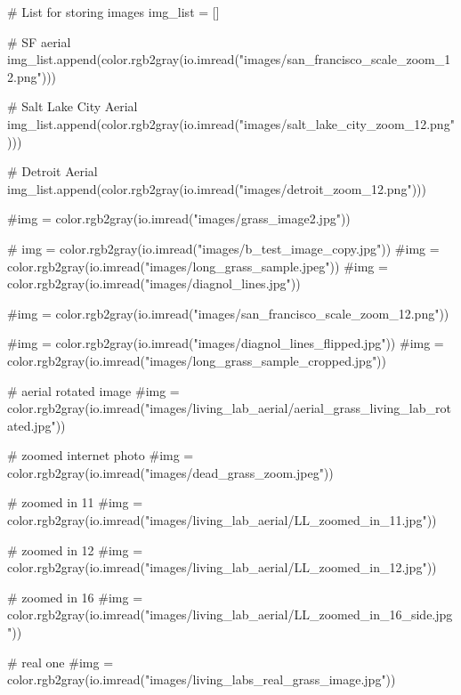 \documentclass[
  letterpaper,
  DIV=11,
  numbers=noendperiod]{scrreprt}
\newenvironment{Shaded}{\begin{snugshade}}{\end{snugshade}}
\newcommand{\CommentTok}[1]{\textcolor[rgb]{0.37,0.37,0.37}{#1}}
\newcommand{\NormalTok}[1]{\textcolor[rgb]{0.00,0.23,0.31}{#1}}
\newcommand{\OperatorTok}[1]{\textcolor[rgb]{0.37,0.37,0.37}{#1}}
\newcommand{\StringTok}[1]{\textcolor[rgb]{0.13,0.47,0.30}{#1}}
\begin{document}
\begin{Shaded}
\begin{Highlighting}[]
\CommentTok{\# List for storing images}
\NormalTok{img\_list }\OperatorTok{=}\NormalTok{ []}

\CommentTok{\# SF aerial}
\NormalTok{img\_list.append(color.rgb2gray(io.imread(}\StringTok{"images/san\_francisco\_scale\_zoom\_12.png"}\NormalTok{)))}

\CommentTok{\# Salt Lake City Aerial}
\NormalTok{img\_list.append(color.rgb2gray(io.imread(}\StringTok{"images/salt\_lake\_city\_zoom\_12.png"}\NormalTok{)))}

\CommentTok{\# Detroit Aerial}
\NormalTok{img\_list.append(color.rgb2gray(io.imread(}\StringTok{"images/detroit\_zoom\_12.png"}\NormalTok{)))}


\CommentTok{\#img = color.rgb2gray(io.imread("images/grass\_image2.jpg"))}

\CommentTok{\# img = color.rgb2gray(io.imread("images/b\_test\_image\_copy.jpg"))}
\CommentTok{\#img = color.rgb2gray(io.imread("images/long\_grass\_sample.jpeg"))}
\CommentTok{\#img = color.rgb2gray(io.imread("images/diagnol\_lines.jpg"))}

\CommentTok{\#img = color.rgb2gray(io.imread("images/san\_francisco\_scale\_zoom\_12.png"))}

\CommentTok{\#img = color.rgb2gray(io.imread("images/diagnol\_lines\_flipped.jpg"))}
\CommentTok{\#img = color.rgb2gray(io.imread("images/long\_grass\_sample\_cropped.jpg"))}

\CommentTok{\# aerial rotated image}
\CommentTok{\#img = color.rgb2gray(io.imread("images/living\_lab\_aerial/aerial\_grass\_living\_lab\_rotated.jpg"))}

\CommentTok{\# zoomed internet photo}
\CommentTok{\#img = color.rgb2gray(io.imread("images/dead\_grass\_zoom.jpeg"))}


\CommentTok{\# zoomed in 11}
\CommentTok{\#img = color.rgb2gray(io.imread("images/living\_lab\_aerial/LL\_zoomed\_in\_11.jpg"))}

\CommentTok{\# zoomed in 12}
\CommentTok{\#img = color.rgb2gray(io.imread("images/living\_lab\_aerial/LL\_zoomed\_in\_12.jpg"))}

\CommentTok{\# zoomed in 16}
\CommentTok{\#img = color.rgb2gray(io.imread("images/living\_lab\_aerial/LL\_zoomed\_in\_16\_side.jpg"))}



\CommentTok{\# real one}
\CommentTok{\#img = color.rgb2gray(io.imread("images/living\_labs\_real\_grass\_image.jpg"))}


\end{Highlighting}
\end{Shaded}
\end{document}
